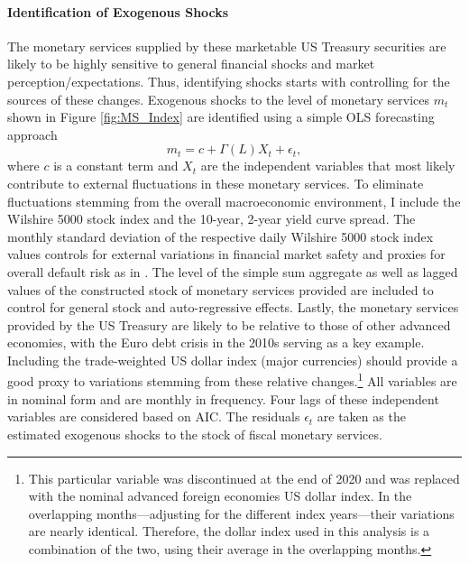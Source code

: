 \documentclass[11pt,a4paper,margin=1.5in]{article}
\begin{document}
\paragraph{Identification of Exogenous Shocks}
The monetary services supplied by these marketable US Treasury securities are likely to be highly sensitive to general financial shocks and market perception/expectations.
Thus, identifying shocks starts with controlling for the sources of these changes. 
Exogenous shocks to the level of monetary services $m_t$ shown in Figure \ref{fig:MS_Index} are identified using a simple OLS forecasting approach
\begin{equation}
	m_t = c + \Gamma(L)X_t + \epsilon_t,
	\label{eq:Shock_ID}
\end{equation}
where $c$ is a constant term and $X_t$ are the independent variables that most likely contribute to external fluctuations in these monetary services.
To eliminate fluctuations stemming from the overall macroeconomic environment, I include the Wilshire 5000 stock index and the 10-year, 2-year yield curve spread.
The monthly standard deviation of the respective daily Wilshire 5000 stock index values controls for external variations in financial market safety and proxies for overall default risk as in \citet{Krishnamurthy-VissingJorgensen:2012}.
The level of the simple sum aggregate as well as lagged values of the constructed stock of monetary services provided are included to control for general stock and auto-regressive effects. 
Lastly, the monetary services provided by the US Treasury are likely to be relative to those of other advanced economies, with the Euro debt crisis in the 2010s serving as a key example. 
Including the trade-weighted US dollar index (major currencies) should provide a good proxy to variations stemming from these relative changes.\footnote{
	This particular variable was discontinued at the end of 2020 and was replaced with the nominal advanced foreign economies US dollar index.
	In the overlapping months---adjusting for the different index years---their variations are nearly identical.
	Therefore, the dollar index used in this analysis is a combination of the two, using their average in the overlapping months.}
All variables are in nominal form and are monthly in frequency.
Four lags of these independent variables are considered based on AIC. 
The residuals $\epsilon_t$ are taken as the estimated exogenous shocks to the stock of fiscal monetary services.
\end{document}
